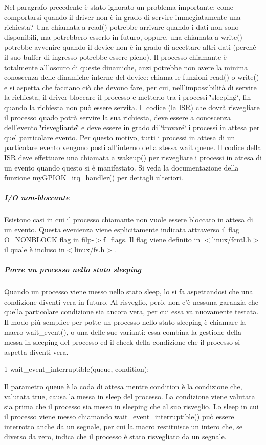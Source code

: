 Nel paragrafo precedente è stato ignorato un problema importante\+: come comportarsi quando il driver non è in grado di servire immegiatamente una richiesta? Una chiamata a read() potrebbe arrivare quando i dati non sono disponibili, ma potrebbero esserlo in futuro, oppure, una chiamata a write() potrebbe avvenire quando il device non è in grado di accettare altri dati (perché il suo buffer di ingresso potrebbe essere pieno). Il processo chiamante è totalmente all'oscuro di queste dinamiche, anzi potrebbe non avere la minima conoscenza delle dinamiche interne del device\+: chiama le funzioni read() o write() e si aspetta che facciano ciò che devono fare, per cui, nell'impossibilità di servire la richiesta, il driver bloccare il processo e metterlo tra i processi \char`\"{}sleeping\char`\"{}, fin quando la richiesta non può essere servita. Il codice (la I\+S\+R) che dovrà risvegliare il processo quado potrà servire la sua richiesta, deve essere a conoscenza dell'evento \char`\"{}risvegliante\char`\"{} e deve essere in grado di \char`\"{}trovare\char`\"{} i processi in attesa per quel particolare evento. Per questo motivo, tutti i processi in attesa di un particolare evento vengono posti all'interno della stessa wait queue. Il codice della I\+S\+R deve effettuare una chiamata a wakeup() per risvegliare i processi in attesa di un evento quando questo si è manifestato. Si veda la documentazione della funzione \hyperlink{group___linux-_driver_ga2fc230a12a97aa63e43b2dc4aec73511}{my\+G\+P\+I\+O\+K\+\_\+irq\+\_\+handler()} per dettagli ulteriori. \subparagraph*{I/\+O non-\/bloccante}

Esistono casi in cui il processo chiamante non vuole essere bloccato in attesa di un evento. Questa evenienza viene esplicitamente indicata attraverso il flag O\+\_\+\+N\+O\+N\+B\+L\+O\+C\+K flag in filp-\/$>$f\+\_\+flags. Il flag viene definito in $<$linux/fcntl.\+h$>$ il quale è incluso in$<$linux/fs.\+h$>$.

\subparagraph*{Porre un processo nello stato sleeping}

Quando un processo viene messo nello stato sleep, lo si fa aspettandosi che una condizione diventi vera in futuro. Al risveglio, però, non c'è nessuna garanzia che quella particolare condizione sia ancora vera, per cui essa va nuovamente testata. Il modo più semplice per potte un processo nello stato sleeping è chiamare la macro wait\+\_\+event(), o una delle sue varianti\+: essa combina la gestione della messa in sleeping del processo ed il check della condizione che il processo si aspetta diventi vera. 
\begin{DoxyCode}
1 wait\_event\_interruptible(queue, condition);
\end{DoxyCode}
 Il parametro queue è la coda di attesa mentre condition è la condizione che, valutata true, causa la messa in sleep del processo. La condizione viene valutata sia prima che il processo sia messo in sleeping che al suo risveglio. Lo sleep in cui il processo viene messo chiamando wait\+\_\+event\+\_\+interruptible() può essere interrotto anche da un segnale, per cui la macro restituisce un intero che, se diverso da zero, indica che il processo è stato risvegliato da un segnale.

